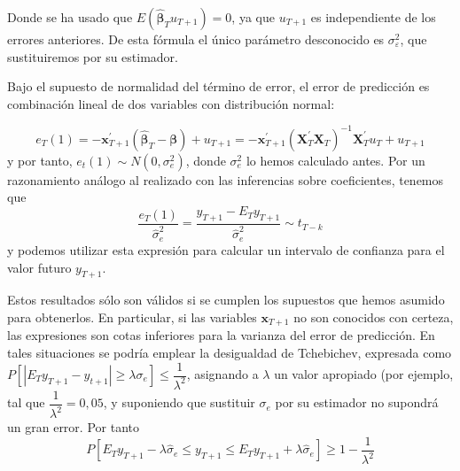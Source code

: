 Donde se ha usado que $E\left(\hat{\boldsymbol{\beta}}_{T}u_{T+1}\right)=0$,
ya que $u_{T+1}$ es independiente de los errores anteriores. De esta
f\'ormula el \'unico par\'ametro desconocido es $\sigma_{\varepsilon}^{2}$, que sustituiremos
por su estimador.



Bajo el supuesto de normalidad del t\'ermino de error, el error de predicci\'on
es combinaci\'on lineal de dos variables con distribuci\'on normal:

\begin{equation*}
e_{T}(1)=-\boldsymbol{x}^{\prime}_{T+1}\left(\hat{\boldsymbol{\beta}}_{T}-\boldsymbol{\beta}\right)+u_{T+1}=-\boldsymbol{x}^{\prime}_{T+1}\left(\boldsymbol{X}_{T}^{\prime}\boldsymbol{X}_{T}\right)^{-1}\boldsymbol{X}_{T}^{\prime}u_{T}+u_{T+1}
\end{equation*}
 y por tanto, $e_{t}(1)\sim N(0,\sigma_{e}^{2})$, donde $\sigma_{e}^{2}$
lo hemos calculado antes. Por un razonamiento an\'alogo al realizado
con las inferencias sobre coeficientes, tenemos que 
\begin{equation*}
\dfrac{e_{T}(1)}{\hat{\sigma}_{e}^{2}}=\dfrac{y_{T+1}-E_{T}y_{T+1}}{\hat{\sigma}_{e}^{2}}\sim t_{T-k}
\end{equation*}
 y podemos utilizar esta expresi\'on para calcular un intervalo de confianza
para el valor futuro $y_{T+1}$.

Estos resultados s\'olo son v\'alidos si se cumplen los supuestos que
hemos asumido para obtenerlos. En particular, si las variables $\boldsymbol{x}{}_{T+1}$
no son conocidos con certeza, las expresiones son cotas inferiores
para la varianza del error de predicci\'on. En tales situaciones se
podr\'ia emplear la desigualdad de Tchebichev, expresada como $P\left[\left|E_{T}y_{T+1}-y_{t+1}\right|\geq\lambda\sigma_{e}\right]\leq\dfrac{1}{\lambda^{2}}$,
asignando a $\lambda$ un valor apropiado (por ejemplo, tal que $\dfrac{1}{\lambda^{2}}=0,05$,
y suponiendo que sustituir $\sigma_{e}$ por su estimador no supondr\'a
un gran error. Por tanto 
\begin{equation*}
P\left[E_{T}y_{T+1}-\lambda\hat{\sigma}_{e}\leq y_{T+1}\leq E_{T}y_{T+1}+\lambda\hat{\sigma}_{e}\right]\geq1-\dfrac{1}{\lambda^{2}}
\end{equation*}

